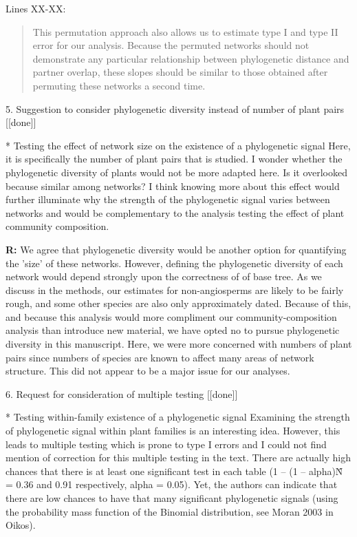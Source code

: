 \documentclass[12pt]{letter}
\newenvironment{refquote}{\bigskip \begin{it}}{\end{it}\smallskip}
\begin{document}
		Lines XX-XX:

		\begin{quotation}
			This permutation approach also allows us to estimate type I and type II 
		    error for our analysis. Because the permuted networks should not demonstrate any particular relationship between phylogenetic distance and partner overlap, these slopes should be similar to those obtained after permuting these networks a second time.
		\end{quotation}


	5. Suggestion to consider phylogenetic diversity instead of number of plant pairs [[done]]

		\begin{refquote}
			* Testing the effect of network size on the existence of a phylogenetic signal
			Here, it is specifically the number of plant pairs that is studied. I wonder whether the phylogenetic diversity of plants would not be more adapted here. Is it overlooked because similar among networks?
			I think knowing more about this effect would further illuminate why the strength of the phylogenetic signal varies between networks and would be complementary to the analysis testing the effect of plant community composition.
		\end{refquote}


		\textbf{R:} We agree that phylogenetic diversity would be another option for quantifying the 'size' of these networks. However, defining the phylogenetic diversity of each network would depend strongly upon the correctness of of base tree. As we discuss in the methods, our estimates for non-angiosperms are likely to be fairly rough, and some other species are also only approximately dated. Because of this, and because this analysis would more compliment our community-composition analysis than introduce new material, we have opted no to pursue phylogenetic diversity in this manuscript. Here, we were more concerned with numbers of plant pairs since numbers of species are known to affect many areas of network structure. This did not appear to be a major issue for our analyses.


	6. Request for consideration of multiple testing [[done]]

		\begin{refquote}
			* Testing within-family existence of a phylogenetic signal
			Examining the strength of phylogenetic signal within plant families is an interesting idea. However, this leads to multiple testing which is prone to type I errors and I could not find mention of correction for this multiple testing in the text. There are actually high chances that there is at least one significant test in each table (1 – (1 – alpha)\^N = 0.36 and 0.91 respectively, alpha = 0.05). Yet, the authors can indicate that there are low chances to have that many significant phylogenetic signals (using the probability mass function of the Binomial distribution, see Moran 2003 in Oikos).
		\end{refquote}
\end{document}

